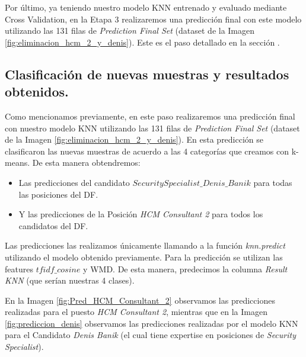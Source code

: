 \documentclass[12pt,a4paper]{article}
\begin{document}
\begin{sloppypar}
\begin{itemize}
\end{itemize}

Por último, ya teniendo nuestro modelo KNN entrenado y evaluado mediante Cross Validation, en la Etapa 3 realizaremos una predicción final con este modelo utilizando las 131 filas de \textit{Prediction Final Set} (dataset de la Imagen \ref{fig:eliminacion_hcm_2_y_denis}). Este es el paso detallado en la sección \textit{}.

\cleardoublepage

\subsection{Clasificación de nuevas muestras y resultados obtenidos.}\label{5.4.Predicciondenuevasmuestrasyresultadosobtenidos}

Como mencionamos previamente, en este paso realizaremos una predicción final con nuestro modelo KNN utilizando las 131 filas de \textit{Prediction Final Set} (dataset de la Imagen \ref{fig:eliminacion_hcm_2_y_denis}). En esta predicción se clasificaron las nuevas muestras de acuerdo a las 4 categorías que creamos con k-means.
De esta manera obtendremos:
\begin{itemize}
\item Las predicciones del candidato \textit{$SecuritySpecialist\_Denis\_Banik$} para todas las posiciones del DF.
\item Y las predicciones de la Posición \textit{HCM Consultant 2} para todos los candidatos del DF.
\end{itemize}

Las predicciones las realizamos únicamente llamando a la función \textit{knn.predict} utilizando el modelo obtenido previamente. Para la predicción se utilizan las features $tfidf\_cosine$ y WMD. De esta manera, predecimos la columna \textit{Result KNN} (que serían nuestras 4 clases). 

En la Imagen \ref{fig:Pred_HCM_Consultant_2} observamos las predicciones realizadas para el puesto \textit{HCM Consultant 2}, mientras que en la Imagen \ref{fig:prediccion_denis} observamos las predicciones realizadas por el modelo KNN para el Candidato \textit{Denis Banik} (el cual tiene expertise en posiciones de \textit{Security Specialist}).


\end{sloppypar}
\end{document}
